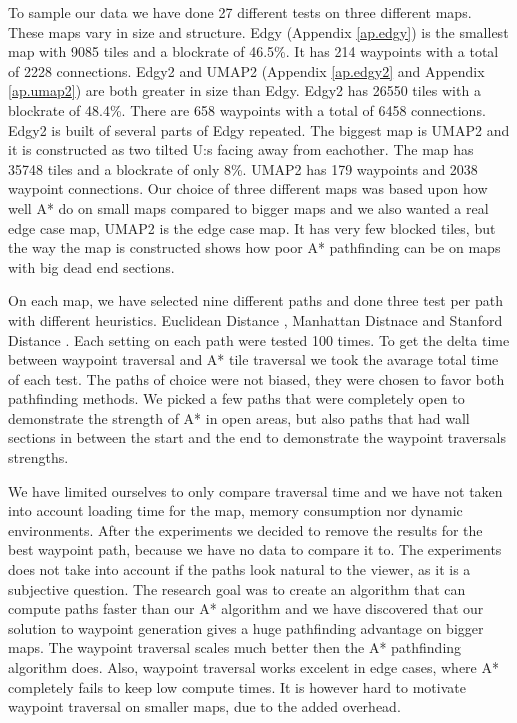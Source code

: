 \documentclass[a4paper]{article}
\begin{document}
{To sample our data we have done 27 different tests on three different maps. These maps vary in size and structure. Edgy (Appendix \ref{ap.edgy}) is the smallest map with 9085 tiles and a blockrate of 46.5\%. It has 214 waypoints with a total of 2228 connections. Edgy2 and UMAP2 (Appendix \ref{ap.edgy2} and Appendix \ref{ap.umap2}) are both greater in size than Edgy. Edgy2 has 26550 tiles with a blockrate of 48.4\%. There are 658 waypoints with a total of 6458 connections. Edgy2 is built of several parts of Edgy repeated. The biggest map is UMAP2 and it is constructed as two tilted U:s facing away from eachother. The map has 35748 tiles and a blockrate of only 8\%. UMAP2 has 179 waypoints and 2038 waypoint connections. Our choice of three different maps was based upon how well A* do on small maps compared to bigger maps and we also wanted a real edge case map, UMAP2 is the edge case map. It has very few blocked tiles, but the way the map is constructed shows how poor A* pathfinding can be on maps with big dead end sections.
	
On each map, we have selected nine different paths and done three test per path with different heuristics. Euclidean Distance \cite{heuristicRef}, Manhattan Distnace \cite{heuristicRef} and Stanford Distance \cite{heuristicRef}.
Each setting on each path were tested 100 times. To get the delta time between waypoint traversal and A* tile traversal we took the avarage total time of each test. The paths of choice were not biased, they were chosen to favor both pathfinding methods. We picked a few paths that were completely open to demonstrate the strength of A* in open areas, but also paths that had wall sections in between the start and the end to demonstrate the waypoint traversals strengths.

We have limited ourselves to only compare traversal time and we have not taken into account loading time for the map, memory consumption nor dynamic environments. After the experiments we decided to remove the results for the best waypoint path, because we have no data to compare it to. The experiments does not take into account if the paths look natural to the viewer, as it is a subjective question. The research goal was to create an algorithm that can compute paths faster than our A* algorithm and we have discovered that our solution to waypoint generation gives a huge pathfinding advantage on bigger maps. The waypoint traversal scales much better then the A* pathfinding algorithm does. Also, waypoint traversal works excelent in edge cases, where A* completely fails to keep low compute times. It is however hard to motivate waypoint traversal on smaller maps, due to the added overhead.

}
\end{document}

